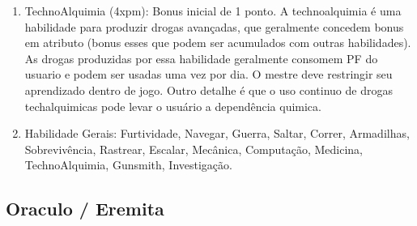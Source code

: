 \begin{enumerate}
	\item TechnoAlquimia (4xpm): Bonus inicial de 1 ponto. A technoalquimia é uma habilidade para produzir drogas avançadas, que geralmente concedem bonus em atributo (bonus esses que podem ser acumulados com outras habilidades). As drogas produzidas por essa habilidade geralmente consomem PF do usuario e podem ser usadas uma vez por dia. O mestre deve restringir seu aprendizado dentro de jogo. Outro detalhe é que o uso continuo de drogas techalquimicas pode levar o usuário a dependência quimica. 
     
		
 	\item Habilidade Gerais: Furtividade, Navegar, Guerra, Saltar, Correr, Armadilhas, Sobrevivência, Rastrear, Escalar, Mecânica, Computação, Medicina, TechnoAlquimia, Gunsmith,  Investigação.

 	
\end{enumerate}
 
 \subsection{Oraculo / Eremita} 
 	
